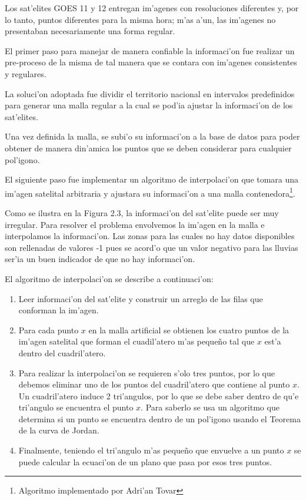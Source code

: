   Los sat'elites GOES 11 y 12 entregan im'agenes con resoluciones diferentes y, por lo tanto, puntos 
  diferentes para la misma hora; m'as a'un, las im'agenes no presentaban necesariamente una forma regular.

  El primer paso para manejar de manera confiable la informaci'on fue realizar un pre-proceso de la misma
  de tal manera que se contara con im'agenes consistentes y regulares.

  La soluci'on adoptada fue dividir el territorio nacional en intervalos predefinidos para generar una malla regular
  a la cual se pod'ia ajustar la informaci'on de los sat'elites.

  Una vez definida la malla, se subi'o su informaci'on a la base de datos para poder obtener 
  de manera din'amica los puntos que se deben considerar para cualquier pol'igono. 

  El siguiente paso fue implementar un algoritmo de interpolaci'on que tomara una im'agen satelital arbitraria y 
  ajustara su informaci'on a una malla contenedora\footnote{Algoritmo
    implementado por Adri'an Tovar}.

 Como se ilustra en la Figura 2.3, la informaci'on del sat'elite puede ser muy irregular. Para resolver el problema 
  envolvemos la im'agen en la malla e interpolamos la informaci'on. Las zonas para las cuales no hay datos disponibles
  son rellenadas de valores -1 pues se acord'o que un valor negativo para las lluvias ser'ia un buen indicador de que no hay
  informaci'on.

  El algoritmo de interpolaci'on se describe a continuaci'on:

  \begin{enumerate}
    \item Leer informaci'on del sat'elite y construir un arreglo de
      las filas que conforman la im'agen.
    \item Para cada punto $x$ en la malla artificial se obtienen los
      cuatro puntos de la im'agen satelital que forman el cuadil'atero
      m'as peque\~no tal que  $x$ est'a dentro del cuadril'atero.
    \item Para realizar la interpolaci'on se requieren s'olo tres
      puntos, por lo que debemos eliminar uno de los puntos del
      cuadril'atero que contiene al punto $x$. 
      Un cuadril'atero induce 2 tri'angulos, por lo que se debe
      saber dentro de qu'e tri'angulo se encuentra el punto $x$. Para
      saberlo se usa un algoritmo que determina si un punto se
      encuentra dentro de un pol'igono usando el Teorema de la curva
      de Jordan.
    \item Finalmente, teniendo el tri'angulo m'as peque\~no que
      envuelve a un punto $x$ se puede calcular la ecuaci'on de un
      plano que pasa por esos tres puntos.
  \end{enumerate}

